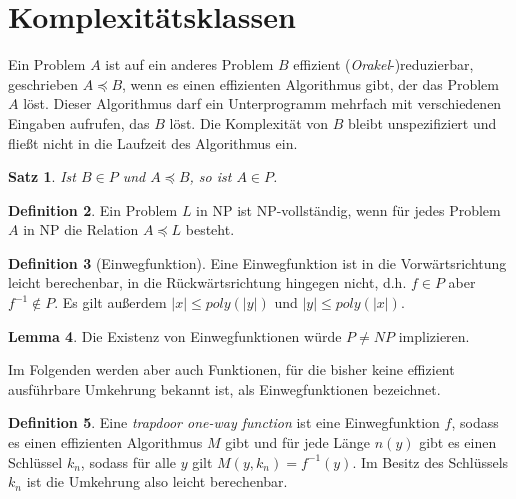 \documentclass[a4paper, 12pt]{article}
\theoremstyle{plain}
\newtheorem{theorem}{Satz}[subsection] %
\theoremstyle{definition}
\newtheorem{definition}[theorem]{Definition} %
\theoremstyle{lemma}
\newtheorem{lemma}[theorem]{Lemma}
\theoremstyle{remark}
\theoremstyle{corollary}
\theoremstyle{example}
\begin{document}
\section{Komplexitätsklassen}
	Ein Problem $A$ ist auf ein anderes Problem $B$ effizient (\textit{Orakel}-)reduzierbar, geschrieben $A\preceq B$, wenn es einen effizienten Algorithmus gibt, der das Problem $A$ löst. Dieser Algorithmus darf ein Unterprogramm mehrfach mit verschiedenen Eingaben aufrufen, das $B$ löst. Die Komplexität von $B$ bleibt unspezifiziert und fließt nicht in die Laufzeit des Algorithmus ein. 
	\begin{theorem}
		Ist $B \in P$ und $A\preceq B$, so ist $A \in P$.
	\end{theorem}
	\begin{definition}
		Ein Problem $L$ in NP ist NP-vollständig, wenn für jedes Problem $A$ in NP die Relation $A\preceq L$ besteht.
	\end{definition}
	\begin{definition}[Einwegfunktion]
		Eine Einwegfunktion ist in die Vorwärtsrichtung leicht berechenbar, in die Rückwärtsrichtung hingegen nicht, d.h. $f\in P$ aber $f^{-1} \notin P$. Es gilt außerdem $\left|x\right| \leq poly(\left|y\right|)$ und $\left|y\right| \leq poly(\left|x\right|)$. 
	\end{definition}
	\begin{lemma}
		Die Existenz von Einwegfunktionen würde $P\neq NP$ implizieren.
	\end{lemma}
	Im Folgenden werden aber auch Funktionen, für die bisher keine effizient ausführbare Umkehrung bekannt ist, als Einwegfunktionen bezeichnet.
	\begin{definition}
		Eine \textit{trapdoor one-way function} ist eine Einwegfunktion $f$, sodass es einen effizienten Algorithmus $M$ gibt und für jede Länge $n(y)$ gibt es einen Schlüssel $k_n$, sodass für alle $y$ gilt $M(y,k_n) = f^{-1}(y)$. Im Besitz des Schlüssels $k_n$ ist die Umkehrung also leicht berechenbar.
	\end{definition}
\end{document}
